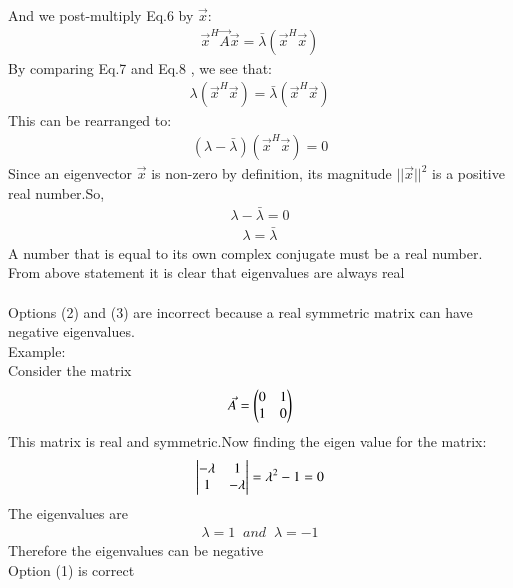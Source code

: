 \documentclass[journal]{IEEEtran}
\theoremstyle{remark}
\begin{document}
And we post-multiply Eq.6 by $\Vec{x}$:
\begin{align}
    \Vec{x}^H \Vec{A}\Vec{x} = \bar{\lambda}(\Vec{x}^H\Vec{x}) \label{eq:post}
\end{align}
By comparing Eq.7 and Eq.8 , we see that:
\begin{align}
 \lambda(\Vec{x}^H\Vec{x}) = \bar{\lambda}(\Vec{x}^H\Vec{x})
\end{align}
This can be rearranged to:
\begin{align}
 (\lambda - \bar{\lambda})(\Vec{x}^H\Vec{x}) = 0
\end{align}
 Since an eigenvector $\Vec{x}$ is non-zero by definition, its magnitude $||\Vec{x}||^2$ is a positive real number.So,
 \begin{align}
     \lambda - \bar{\lambda} = 0 
 \end{align}
 \begin{align}
     \lambda = \bar{\lambda}
 \end{align}
A number that is equal to its own complex conjugate must be a real number.\\
From above statement it is clear that eigenvalues are always real\\\\
Options (2) and (3) are incorrect because a real symmetric matrix can have negative eigenvalues.\\
Example:\\
Consider the matrix 
\begin{align}
    \Vec{A} = \begin{pmatrix}0 & 1 \\ 1 & 0\end{pmatrix}
\end{align}
This matrix is real and symmetric.Now finding the eigen value for the matrix:
\begin{align}
   \begin{vmatrix}-\lambda&1\\1&-\lambda\end{vmatrix}=\lambda^2-1= 0
\end{align}
The eigenvalues are
\begin{align}
    \lambda = 1\;\;and\;\;\lambda = -1
\end{align}
Therefore the eigenvalues can be negative\\
Option (1) is correct
\end{document}
